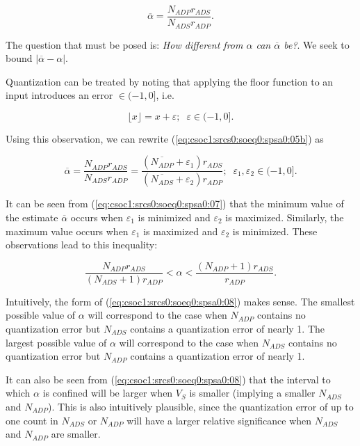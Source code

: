 \begin{equation}
\label{eq:csoc1:srcs0:soeq0:spsa0:05b}
\overline{\alpha} 
= 
\frac{N_{ADP} r_{ADS}}{N_{ADS} r_{ADP}}.
\end{equation}

The question that must be posed is:
\emph{How different from $\alpha$ can $\overline{\alpha}$ be?}.
We seek to bound $|\overline{\alpha}-\alpha|$.

Quantization can be treated by noting that applying the floor function
to an input introduces an error $\in (-1,0]$, i.e.

\begin{equation}
\label{eq:csoc1:srcs0:soeq0:spsa0:06}
\lfloor x \rfloor = x + \varepsilon; \;\; \varepsilon \in  (-1,0].
\end{equation}

Using this observation, we can rewrite
(\ref{eq:csoc1:srcs0:soeq0:spsa0:05b}) as

\begin{equation}
\label{eq:csoc1:srcs0:soeq0:spsa0:07}
\overline{\alpha} 
= 
\frac{N_{ADP} r_{ADS}}{N_{ADS} r_{ADP}}
=
\frac{(\overline{N_{ADP}} + \varepsilon_1) r_{ADS}}{(\overline{N_{ADS}} + \varepsilon_2) r_{ADP}} ;
\;\;
\varepsilon_1, \varepsilon_2 \in (-1, 0].
\end{equation}

\noindent{}It can be seen from
(\ref{eq:csoc1:srcs0:soeq0:spsa0:07})
that the minimum value of the estimate 
$\overline{\alpha}$ occurs when $\varepsilon_1$ is minimized and 
$\varepsilon_2$ is maximized.  Similarly, the maximum 
value occurs when $\varepsilon_1$ is maximized and 
$\varepsilon_2$ is minimized.  These observations lead to this
inequality:

\begin{equation}
\label{eq:csoc1:srcs0:soeq0:spsa0:08}
\frac{N_{ADP} r_{ADS}}{(N_{ADS}+1) r_{ADP}}
<
\alpha
<
\frac{(N_{ADP}+1) r_{ADS}}{r_{ADP}} .
\end{equation}

Intuitively, the form of (\ref{eq:csoc1:srcs0:soeq0:spsa0:08})
makes sense.  The smallest possible value of $\alpha$ will correspond
to the case
when $N_{ADP}$ contains no quantization error but $N_{ADS}$ contains
a quantization error of nearly 1.
The largest possible value of $\alpha$ will correspond
to the case
when $N_{ADS}$ contains no quantization error but $N_{ADP}$ contains
a quantization error of nearly 1.

It can also be seen from (\ref{eq:csoc1:srcs0:soeq0:spsa0:08}) that
the interval to which $\alpha$ is confined will be larger
when $V_S$ is smaller (implying a smaller $N_{ADS}$ and $N_{ADP}$).
This is also intuitively plausible, since the quantization error 
of up to one count in $N_{ADS}$ or $N_{ADP}$ will have a larger
relative significance when $N_{ADS}$ and $N_{ADP}$ are smaller.

